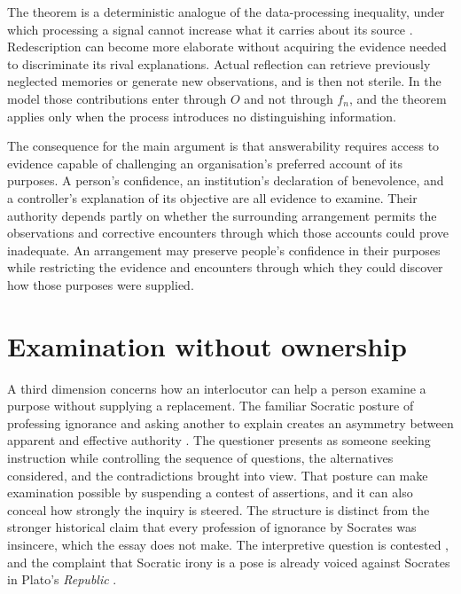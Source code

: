 \documentclass[11pt]{article}
\theoremstyle{definition}
\theoremstyle{remark}
\begin{document}
The theorem is a deterministic analogue of the data-processing inequality, under which processing a signal cannot increase what it carries about its source \cite{cover2006}. Redescription can become more elaborate without acquiring the evidence needed to discriminate its rival explanations. Actual reflection can retrieve previously neglected memories or generate new observations, and is then not sterile. In the model those contributions enter through $O$ and not through $f_n$, and the theorem applies only when the process introduces no distinguishing information.

The consequence for the main argument is that answerability requires access to evidence capable of challenging an organisation's preferred account of its purposes. A person's confidence, an institution's declaration of benevolence, and a controller's explanation of its objective are all evidence to examine. Their authority depends partly on whether the surrounding arrangement permits the observations and corrective encounters through which those accounts could prove inadequate. An arrangement may preserve people's confidence in their purposes while restricting the evidence and encounters through which they could discover how those purposes were supplied.

\section{Examination without ownership}\label{sec:socratic}

A third dimension concerns how an interlocutor can help a person examine a purpose without supplying a replacement. The familiar Socratic posture of professing ignorance and asking another to explain creates an asymmetry between apparent and effective authority \cite{vlastos1987,vlastos1983}. The questioner presents as someone seeking instruction while controlling the sequence of questions, the alternatives considered, and the contradictions brought into view. That posture can make examination possible by suspending a contest of assertions, and it can also conceal how strongly the inquiry is steered. The structure is distinct from the stronger historical claim that every profession of ignorance by Socrates was insincere, which the essay does not make. The interpretive question is contested \cite{vlastos1987}, and the complaint that Socratic irony is a pose is already voiced against Socrates in Plato's \emph{Republic} \cite{plato}.
\end{document}
